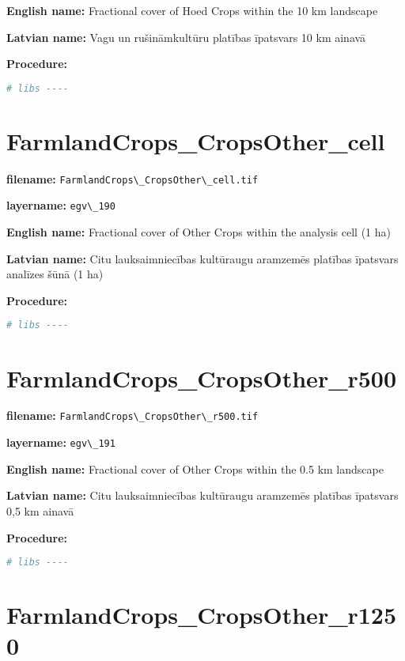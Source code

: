 \documentclass[
]{book}
\newcommand{\passthrough}[1]{#1}
\begin{document}
\textbf{English name:} Fractional cover of Hoed Crops within the 10 km landscape

\textbf{Latvian name:} Vagu un rušināmkultūru platības īpatsvars 10 km ainavā

\textbf{Procedure:}

\begin{lstlisting}[language=R]
# libs ----
\end{lstlisting}

\section{FarmlandCrops\_CropsOther\_cell}\label{ch06.190}

\textbf{filename:} \passthrough{\lstinline!FarmlandCrops\_CropsOther\_cell.tif!}

\textbf{layername:} \passthrough{\lstinline!egv\_190!}

\textbf{English name:} Fractional cover of Other Crops within the analysis cell (1 ha)

\textbf{Latvian name:} Citu lauksaimniecības kultūraugu aramzemēs platības īpatsvars analīzes šūnā (1 ha)

\textbf{Procedure:}

\begin{lstlisting}[language=R]
# libs ----
\end{lstlisting}

\section{FarmlandCrops\_CropsOther\_r500}\label{ch06.191}

\textbf{filename:} \passthrough{\lstinline!FarmlandCrops\_CropsOther\_r500.tif!}

\textbf{layername:} \passthrough{\lstinline!egv\_191!}

\textbf{English name:} Fractional cover of Other Crops within the 0.5 km landscape

\textbf{Latvian name:} Citu lauksaimniecības kultūraugu aramzemēs platības īpatsvars 0,5 km ainavā

\textbf{Procedure:}

\begin{lstlisting}[language=R]
# libs ----
\end{lstlisting}

\section{FarmlandCrops\_CropsOther\_r1250}\label{ch06.192}
\end{document}
